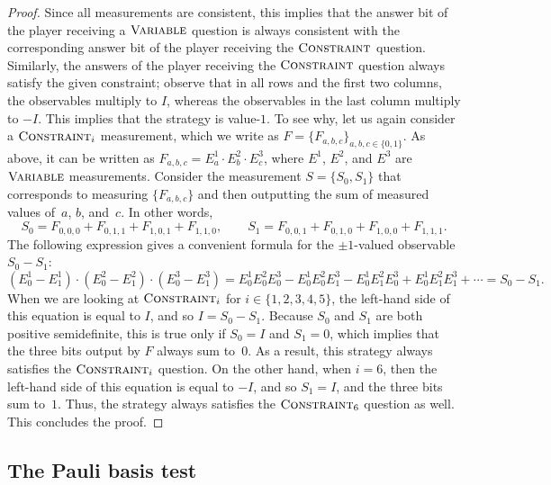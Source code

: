 \documentclass[11pt]{article}
\theoremstyle{definition}
\newcommand{\typestyle}[1]{\ensuremath{\textsc{#1}}\xspace}
\newcommand{\Constraint}{\typestyle{Constraint}}
\newcommand{\Variable}{\typestyle{Variable}}
\begin{document}
\begin{proof}
  Since all measurements are consistent, this implies that the answer bit of the
  player receiving a $\Variable$ question is always consistent with the
  corresponding answer bit of the player receiving the $\Constraint$ question.
  Similarly, the answers of the player receiving the $\Constraint$ question
  always satisfy the given constraint; observe that in all rows and the first
  two columns, the observables multiply to $I$, whereas the observables in the
  last column multiply to $-I$.
  This implies that the strategy is value-$1$.
  To see why, 
  let us again consider a $\Constraint_i$ measurement, which we write as $F=\{F_{a, b, c}\}_{a, b, c \in \{0, 1\}}$.
  As above, it can be written as  $F_{a, b, c} = E^1_a \cdot E^2_b \cdot E^3_c$, where $E^1$, $E^2$, and $E^3$ are $\Variable$ measurements.
  Consider the measurement $S=\{S_0, S_1\}$ that corresponds to measuring $\{F_{a, b, c}\}$ and then outputting the sum of measured values of~$a$, $b$, and~$c$.
  In other words,
  \begin{equation*}
  S_0 = F_{0, 0, 0} + F_{0, 1, 1} + F_{1, 0, 1} + F_{1, 1, 0},
  \qquad
  S_1 = F_{0, 0, 1} + F_{0, 1, 0} + F_{1, 0, 0} + F_{1, 1, 1}.
  \end{equation*}
  The following expression gives a convenient formula for the $\pm 1$-valued observable $S_0 - S_1$:
  \begin{equation*}
  (E_0^1 - E_1^1) \cdot (E_0^2 - E_1^2) \cdot (E_0^3 - E_1^3)
  = E_0^1 E_0^2 E_0^3 - E_0^1 E_0^2 E_1^3 - E_0^1 E_1^2 E_0^3 + E_0^1 E_1^2 E_1^3 + \cdots
  = S_0 - S_1.
  \end{equation*}
  When we are looking at $\Constraint_i$ for $i \in \{1, 2, 3, 4, 5\}$,
  the left-hand side of this equation is equal to $I$, and so $I = S_0- S_1$.
  Because $S_0$ and $S_1$ are both positive semidefinite,
  this is true only if $S_0 = I$ and $S_1 = 0$, which implies that the three bits output by $F$ always sum to~$0$.
  As a result, this strategy always satisfies the $\Constraint_i$ question.
  On the other hand, when $i = 6$, then the left-hand side of this equation is equal to $-I$,
  and so $S_1 = I$, and the three bits sum to~$1$.
  Thus, the strategy always satisfies the $\Constraint_6$ question as well.
  This concludes the proof.
\end{proof}

\subsection{The Pauli basis test}
\label{sec:pauli-verifier}
\end{document}
